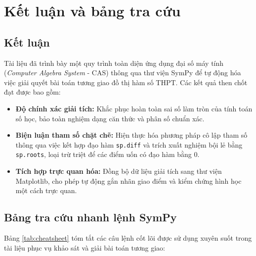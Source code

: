 \chapter{Kết luận và bảng tra cứu}

\section{Kết luận}

Tài liệu đã trình bày một quy trình toàn diện ứng dụng đại số máy tính (\textit{Computer Algebra System} - CAS) thông qua thư viện SymPy để tự động hóa việc giải quyết bài toán tương giao đồ thị hàm số THPT. Các kết quả then chốt đạt được bao gồm:
\begin{itemize}
    \item \textbf{Độ chính xác giải tích:} Khắc phục hoàn toàn sai số làm tròn của tính toán số học, bảo toàn nghiệm dạng căn thức và phân số chuẩn xác.
    \item \textbf{Biện luận tham số chặt chẽ:} Hiện thực hóa phương pháp cô lập tham số thông qua việc kết hợp đạo hàm \texttt{sp.diff} và trích xuất nghiệm bội lẻ bằng \texttt{sp.roots}, loại trừ triệt để các điểm uốn có đạo hàm bằng 0.
    \item \textbf{Tích hợp trực quan hóa:} Đồng bộ dữ liệu giải tích sang thư viện Matplotlib, cho phép tự động gắn nhãn giao điểm và kiểm chứng hình học một cách trực quan.
\end{itemize}

\section{Bảng tra cứu nhanh lệnh SymPy}

Bảng \ref{tab:cheatsheet} tóm tắt các câu lệnh cốt lõi được sử dụng xuyên suốt trong tài liệu phục vụ khảo sát và giải bài toán tương giao:


